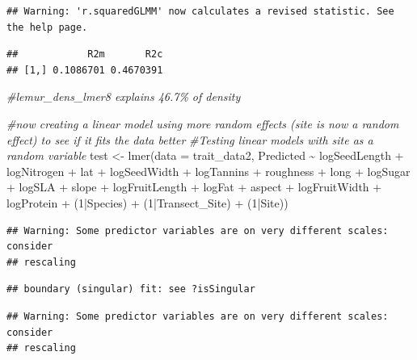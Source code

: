 \documentclass[
  12pt,
]{article}
\newenvironment{Shaded}{\begin{snugshade}}{\end{snugshade}}
\newcommand{\AttributeTok}[1]{\textcolor[rgb]{0.77,0.63,0.00}{#1}}
\newcommand{\CommentTok}[1]{\textcolor[rgb]{0.56,0.35,0.01}{\textit{#1}}}
\newcommand{\DecValTok}[1]{\textcolor[rgb]{0.00,0.00,0.81}{#1}}
\newcommand{\FunctionTok}[1]{\textcolor[rgb]{0.00,0.00,0.00}{#1}}
\newcommand{\NormalTok}[1]{#1}
\newcommand{\OtherTok}[1]{\textcolor[rgb]{0.56,0.35,0.01}{#1}}
\newcommand{\SpecialCharTok}[1]{\textcolor[rgb]{0.00,0.00,0.00}{#1}}
\begin{document}
\begin{verbatim}
## Warning: 'r.squaredGLMM' now calculates a revised statistic. See the help page.
\end{verbatim}

\begin{verbatim}
##            R2m       R2c
## [1,] 0.1086701 0.4670391
\end{verbatim}

\begin{Shaded}
\begin{Highlighting}[]
\CommentTok{\#lemur\_dens\_lmer8 explains 46.7\% of density}

\CommentTok{\#now creating a linear model using more random effects (site is now a random effect) to see if it fits the data better}
\CommentTok{\#Testing linear models with site as a random variable}
\NormalTok{test }\OtherTok{\textless{}{-}} \FunctionTok{lmer}\NormalTok{(}\AttributeTok{data =}\NormalTok{ trait\_data2, Predicted }\SpecialCharTok{\textasciitilde{}}\NormalTok{ logSeedLength }\SpecialCharTok{+}\NormalTok{ logNitrogen }\SpecialCharTok{+}\NormalTok{ lat }\SpecialCharTok{+}\NormalTok{ logSeedWidth }\SpecialCharTok{+}\NormalTok{ logTannins }\SpecialCharTok{+}\NormalTok{ roughness }\SpecialCharTok{+}\NormalTok{ long }\SpecialCharTok{+}\NormalTok{ logSugar }\SpecialCharTok{+}\NormalTok{ logSLA }\SpecialCharTok{+}\NormalTok{ slope }\SpecialCharTok{+}\NormalTok{ logFruitLength }\SpecialCharTok{+}\NormalTok{ logFat }\SpecialCharTok{+}\NormalTok{ aspect }\SpecialCharTok{+}\NormalTok{ logFruitWidth }\SpecialCharTok{+}\NormalTok{ logProtein }\SpecialCharTok{+}\NormalTok{ (}\DecValTok{1}\SpecialCharTok{|}\NormalTok{Species) }\SpecialCharTok{+}\NormalTok{ (}\DecValTok{1}\SpecialCharTok{|}\NormalTok{Transect\_Site) }\SpecialCharTok{+}\NormalTok{ (}\DecValTok{1}\SpecialCharTok{|}\NormalTok{Site))}
\end{Highlighting}
\end{Shaded}

\begin{verbatim}
## Warning: Some predictor variables are on very different scales: consider
## rescaling
\end{verbatim}

\begin{verbatim}
## boundary (singular) fit: see ?isSingular
\end{verbatim}

\begin{verbatim}
## Warning: Some predictor variables are on very different scales: consider
## rescaling
\end{verbatim}
\end{document}
